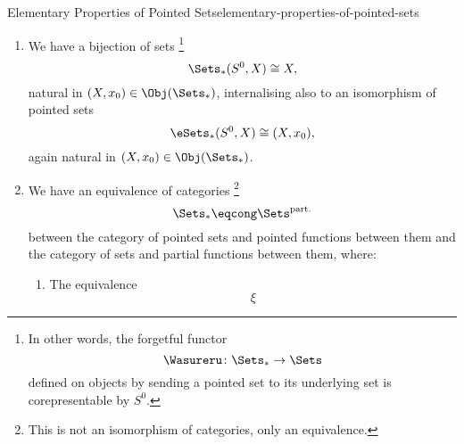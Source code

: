 \begin{proposition}{Elementary Properties of Pointed Sets}{elementary-properties-of-pointed-sets}
\begin{enumerate}
            \footnote{%
                The category $\Sets_{*}$ does admit a natural monoidal closed structure, however; see \ChapterTensorProductsOfPointedSets.
            }%
        \item\label{elementary-properties-of-pointed-sets-morphisms-from-the-monoidal-unit}We have a bijection of sets%
            \footnote{%
                In other words, the forgetful functor
                \[%
                    \Wasureru%
                    \colon%
                    \Sets_{*}%
                    \to%
                    \Sets%
                \]%
                defined on objects by sending a pointed set to its underlying set is corepresentable by $S^{0}$.
                \par\vspace*{\TCBBoxCorrection}
            }%
            \[
                \Sets_{*}(S^{0},X)
                \cong
                X,
            \]%
            natural in $(X,x_{0})\in\Obj(\Sets_{*})$, internalising also to an isomorphism of pointed sets
            \[
                \eSets_{*}(S^{0},X)
                \cong
                (X,x_{0}),
            \]%
            again natural in $(X,x_{0})\in\Obj(\Sets_{*})$.
        \item\label{elementary-properties-of-pointed-sets-relation-to-partial-functions}We have an equivalence of categories%
            \footnote{%
                \textdbend{}This is not an isomorphism of categories, only an equivalence.
                \par\vspace*{\TCBBoxCorrection}
            }%
            \[
                \Sets_{*}%
                \eqcong%
                \Sets^{\mathrm{part.}}
            \]%
            between the category of pointed sets and pointed functions between them and the category of sets and partial functions between them, where:
            \begin{enumerate}
                \item\label{elementary-properties-of-pointed-sets-relation-to-partial-functions-a}The equivalence
                    \[
                        \xi%
\]
\end{enumerate}
\end{enumerate}
\end{proposition}
